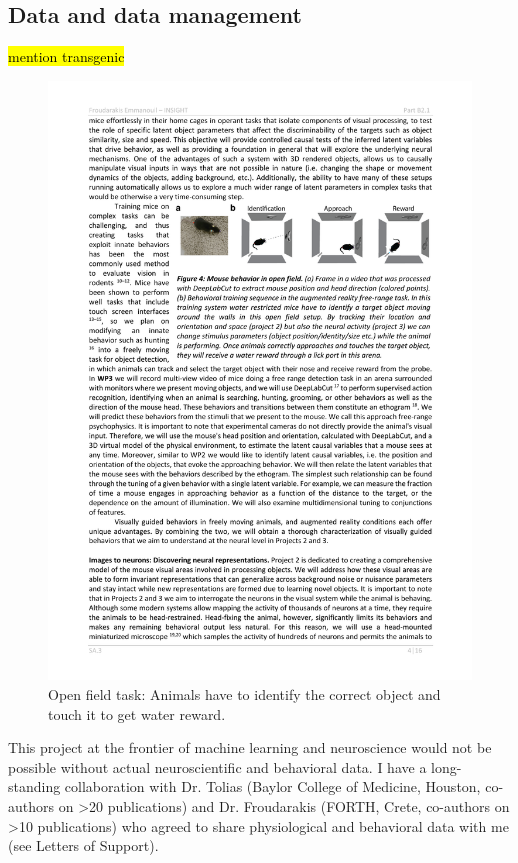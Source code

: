 \documentclass[B2,COG]{ercgrant}
\begin{document}
\subsection{Data and data management}
\label{sub:data}
\hl{mention transgenic}
\begin{figure}
\includegraphics[width=\linewidth,trim=0 15 0 5, clip]{figures/openfield_ar.pdf}
\caption{Open field task: Animals have to identify the correct object and touch it to get water reward.}
\label{fig:openfield}
\end{figure}
This project at the frontier of machine learning and neuroscience would not be possible without actual neuroscientific and behavioral data. 
I have a long-standing collaboration with Dr. Tolias (Baylor College of Medicine, Houston, co-authors on >20  publications) and Dr. Froudarakis (FORTH, Crete, co-authors on >10 publications) who agreed to share physiological and behavioral data with me (see Letters of Support).
\end{document}
